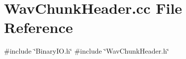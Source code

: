\section{Wav\+Chunk\+Header.\+cc File Reference}
\label{WavChunkHeader_8cc}
{\ttfamily \#include \char`\"{}Binary\+I\+O.\+h\char`\"{}}\newline
{\ttfamily \#include \char`\"{}Wav\+Chunk\+Header.\+h\char`\"{}}\newline
